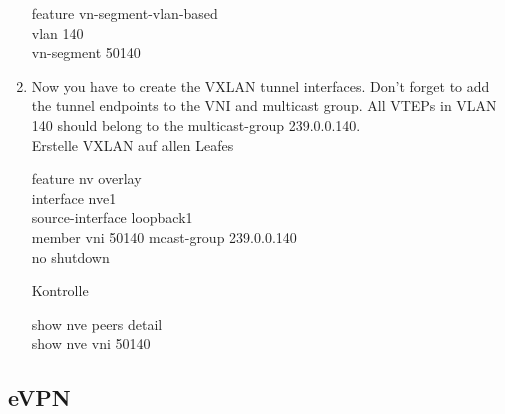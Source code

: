 \documentclass[11pt,titlepage]{article}
\newenvironment{shadedquotation}
 {\begin{shaded*}
  \quoting[leftmargin=0pt, vskip=0pt]
 }
 {\endquoting
 \end{shaded*}
}
\begin{document}
\begin{enumerate}
	\begin{shadedquotation}
		feature vn-segment-vlan-based \\
		vlan 140 \\
		vn-segment 50140
	\end{shadedquotation}
\item Now you have to create the VXLAN tunnel interfaces. Don’t forget to add the tunnel endpoints to the VNI and multicast group. All VTEPs in VLAN 140 should belong to the multicast-group 239.0.0.140. \\
	Erstelle VXLAN auf allen Leafes
	\begin{shadedquotation}
		feature nv overlay \\
		interface nve1 \\
		source-interface loopback1 \\
		member vni 50140 mcast-group 239.0.0.140 \\
		no shutdown
	\end{shadedquotation}
	Kontrolle
	\begin{shadedquotation}
		show nve peers detail \\
		show nve vni 50140
	\end{shadedquotation}
\end{enumerate}

\subsection{eVPN}
\end{document}
